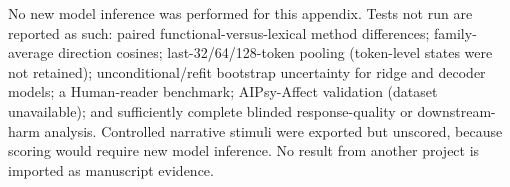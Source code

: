 No new model inference was performed for this appendix. Tests not run are reported as such: paired functional-versus-lexical method differences; family-average direction cosines; last-32/64/128-token pooling (token-level states were not retained); unconditional/refit bootstrap uncertainty for ridge and decoder models; a Human-reader benchmark; AIPsy-Affect validation (dataset unavailable); and sufficiently complete blinded response-quality or downstream-harm analysis. Controlled narrative stimuli were exported but unscored, because scoring would require new model inference. No result from another project is imported as manuscript evidence.
